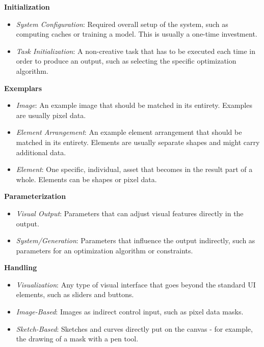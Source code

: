 \noindent\textbf{Initialization}

\begin{itemize}
    \item \textit{System Configuration}: Required overall setup of the system, such as computing caches or training a model. This is usually a one-time investment.
    \item \textit{Task Initialization}: A non-creative task that has to be executed each time in order to produce an output, such as selecting the specific optimization algorithm.
\end{itemize}

\noindent\textbf{Exemplars}

\begin{itemize}
    \item \textit{Image}: An example image that should be matched in its entirety. Examples are usually pixel data.
    \item \textit{Element Arrangement}: An example element arrangement that should be matched in its entirety. Elements are usually separate shapes and might carry additional data.
    \item \textit{Element}: One specific, individual, asset that becomes in the result part of a whole. Elements can be shapes or pixel data.
\end{itemize}

\noindent\textbf{Parameterization}

\begin{itemize}
    \item \textit{Visual Output}: Parameters that can adjust visual features directly in the output.
    \item \textit{System/Generation}: Parameters that influence the output indirectly, such as parameters for an optimization algorithm or constraints.
\end{itemize}

\noindent\textbf{Handling}

\begin{itemize}
    \item \textit{Visualization}: Any type of visual interface that goes beyond the standard UI elements, such as sliders and buttons.
    \item \textit{Image-Based}: Images as indirect control input, such as pixel data masks.
    \item \textit{Sketch-Based}: Sketches and curves directly put on the canvas - for example, the drawing of a mask with a pen tool.
\end{itemize}

